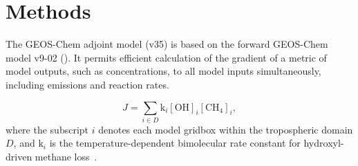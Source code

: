 \section{Methods}

The GEOS-Chem adjoint model\cite{ref:henze2007} (v35) is based on the forward GEOS-Chem model v9-02 (\href{http://www.geos-chem.org}{}). It permits efficient calculation of the gradient of a metric of model outputs, such as concentrations, to all model inputs simultaneously, including emissions and reaction rates\cite{ref:walker2015}.

\begin{equation}
J=\sum_{i \in D} \mathrm{k}_i \mathrm{[OH]}_i \mathrm{[CH_4]}_i,
\end{equation}
where the subscript $i$ denotes each model gridbox within the tropospheric domain $D$, and $\mathrm{k}_i$ is the temperature-dependent bimolecular rate constant for hydroxyl-driven methane loss~\citep{ref:sander2011}.
